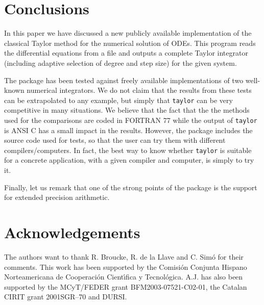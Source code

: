 \documentclass[12pt,twoside]{article}
\begin{document}
\section{Conclusions}
In this paper we have discussed a new publicly available
implementation of the classical Taylor method for the numerical
solution of ODEs. This program reads the differential equations from a
file and outputs a complete Taylor integrator (including adaptive
selection of degree and step size) for the given system.

The package has been tested against freely available implementations
of two well-known numerical integrators. We do not claim that the
results from these tests can be extrapolated to any example, but
simply that \texttt{taylor} can be very competitive in many
situations. We believe that the fact that the the methods used for the
comparisons are coded in FORTRAN 77 while the output of
\texttt{taylor} is ANSI C has a small impact in the results. However,
the package includes the source code used for tests, so that the user
can try them with different compilers/computers. In fact, the best way
to know whether \texttt{taylor} is suitable for a concrete
application, with a given compiler and computer, is simply to try it.

Finally, let us remark that one of the strong points of the package
is the support for extended precision arithmetic.


\section*{Acknowledgements}
The authors want to thank R. Broucke, R. de la Llave and C. Sim\'o for
their comments. This work has been supported by the Comisi\'on
Conjunta Hispano Norteamericana de Cooperaci\'on Cient\'{\i}fica y
Tecnol\'ogica. A.J. has also been supported by the MCyT/FEDER grant
BFM2003-07521-C02-01, the Catalan CIRIT grant 2001SGR--70 and DURSI.



\end{document}
